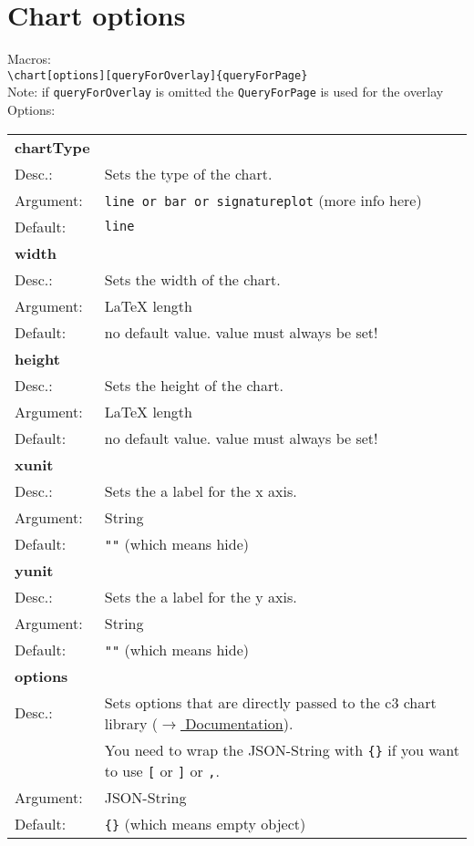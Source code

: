 \documentclass[11pt]{scrartcl}
\begin{document}
\section{Chart options}
Macros: \\[3pt]
\verb|\chart[options][queryForOverlay]{queryForPage}| \\
Note: if \verb|queryForOverlay| is omitted the \verb|QueryForPage| is used for the overlay\\[8pt]
\noindent Options: \\[3pt]
\begin{tabular}{ll}
\textbf{chartType} & \\
Desc.:	&	Sets the type of the chart. \\
Argument:	&\verb|line or bar or signatureplot| (more info here)  \\
Default:&	\verb|line| \\[4pt]

\textbf{width} & \\
Desc.:	&	Sets the width of the chart. \\
Argument:	&LaTeX length \\
Default:&	no default value. value must always be set! \\[4pt]

\textbf{height} \\
Desc.:	&	Sets the height of the chart. \\
Argument: &	LaTeX length \\
Default:&	no default value. value must always be set! \\[4pt]

\textbf{xunit} \\
Desc.:	&	Sets the a label for the x axis. \\
Argument: &	String \\
Default:& 	\verb|""| (which means hide) \\[4pt]

\textbf{yunit} \\
Desc.:	&	Sets the a label for the y axis. \\
Argument: 	&String \\
Default:& 	\verb|""| (which means hide) \\[4pt]

\textbf{options} \\
Desc.:	&	Sets options that are directly passed to the c3 chart library (\href{http://c3js.org/reference.html}{$\rightarrow$ Documentation}). \\
& You need to wrap the JSON-String with \verb|{}| if you want to use \verb|[| or \verb|]| or \verb|,|. \\
Argument: 	&JSON-String \\
Default:&	\verb|{}| (which means empty object) \\[4pt]


\end{tabular}
\end{document}
